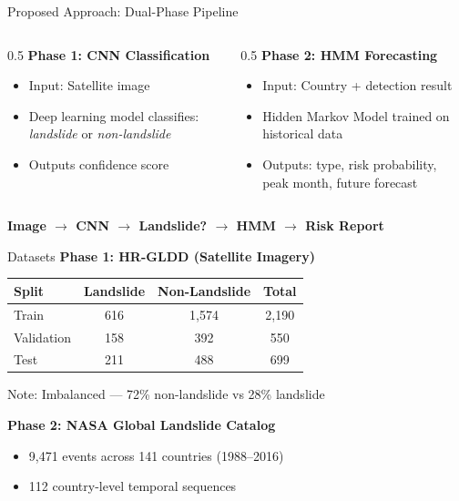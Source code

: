 \documentclass[aspectratio=169]{beamer}
\begin{document}
\begin{frame}{Proposed Approach: Dual-Phase Pipeline}
    \begin{columns}
        \begin{column}{0.5\textwidth}
            \textbf{Phase 1: CNN Classification}
            \begin{itemize}
                \item Input: Satellite image
                \item Deep learning model classifies: \textit{landslide} or \textit{non-landslide}
                \item Outputs confidence score
            \end{itemize}
        \end{column}
        \begin{column}{0.5\textwidth}
            \textbf{Phase 2: HMM Forecasting}
            \begin{itemize}
                \item Input: Country + detection result
                \item Hidden Markov Model trained on historical data
                \item Outputs: type, risk probability, peak month, future forecast
            \end{itemize}
        \end{column}
    \end{columns}

    \vspace{0.5cm}
    \centering
    \textbf{Image $\rightarrow$ CNN $\rightarrow$ Landslide? $\rightarrow$ HMM $\rightarrow$ Risk Report}
\end{frame}

\begin{frame}{Datasets}
    \textbf{Phase 1: HR-GLDD (Satellite Imagery)}
    \begin{table}
        \centering
        \small
        \begin{tabular}{lccc}
            \toprule
            \textbf{Split} & \textbf{Landslide} & \textbf{Non-Landslide} & \textbf{Total} \\
            \midrule
            Train & 616 & 1,574 & 2,190 \\
            Validation & 158 & 392 & 550 \\
            Test & 211 & 488 & 699 \\
            \bottomrule
        \end{tabular}
    \end{table}
    \small Note: Imbalanced --- 72\% non-landslide vs 28\% landslide

    \vspace{0.3cm}
    \textbf{Phase 2: NASA Global Landslide Catalog}
    \begin{itemize}
        \item 9,471 events across 141 countries (1988--2016)
        \item 112 country-level temporal sequences
    \end{itemize}
\end{frame}
\end{document}

